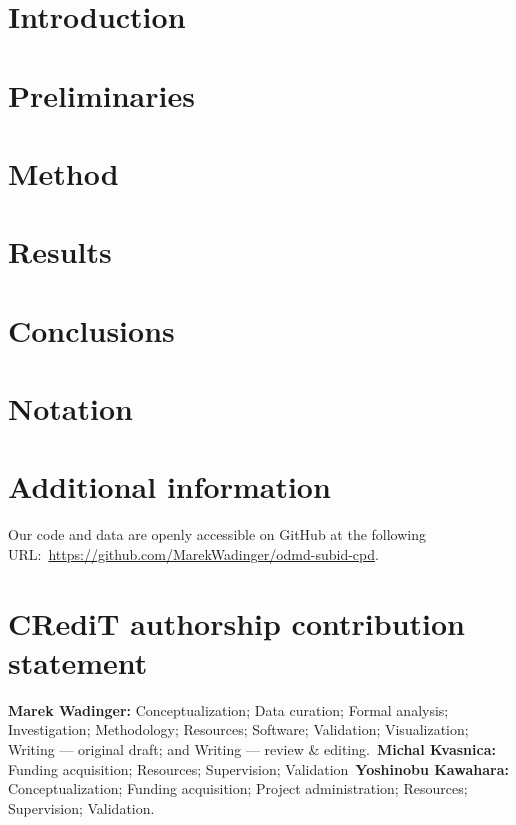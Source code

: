 \documentclass[preprint,12pt,authoryear]{elsarticle}
\begin{document}
\linenumbers{}

\section{Introduction}\label{sec:introduction}


\section{Preliminaries}\label{sec:preliminaries}


\clearpage
\section{Method}\label{sec:method}


\clearpage
\section{Results}\label{sec:results}


\section{Conclusions}\label{sec:conclusions}


\section*{Notation}


\section*{Additional information}
Our code and data are openly accessible on GitHub at the following URL:~\url{https://github.com/MarekWadinger/odmd-subid-cpd}.

\section*{CRediT authorship contribution statement}
\textbf{Marek Wadinger:} Conceptualization; Data curation; Formal analysis; Investigation; Methodology; Resources; Software; Validation; Visualization; Writing --- original draft; and Writing --- review \& editing.~\textbf{Michal Kvasnica:} Funding acquisition; Resources; Supervision; Validation~\textbf{Yoshinobu Kawahara:} Conceptualization; Funding acquisition; Project administration; Resources; Supervision; Validation.
\end{document}
